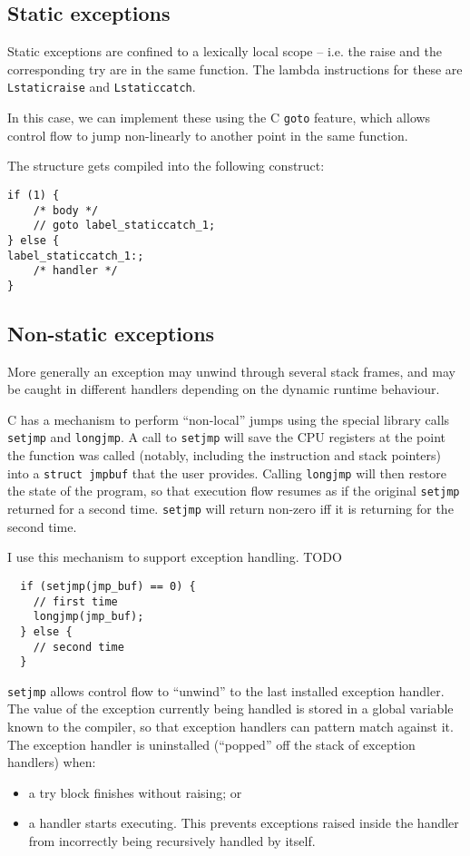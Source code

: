 \documentclass[12pt,a4paper,twoside,openright]{report}
\begin{document}
\subsection{Static exceptions}

Static exceptions are confined to a lexically local scope -- i.e. the raise and the corresponding try are in the same function. The lambda instructions for these are \lstinline!Lstaticraise! and \lstinline!Lstaticcatch!.

In this case, we can implement these using the C \lstinline!goto! feature, which allows control flow to jump non-linearly to another point in the same function.

The structure gets compiled into the following construct:

\begin{lstlisting}
if (1) {
    /* body */
    // goto label_staticcatch_1;
} else {
label_staticcatch_1:;
    /* handler */
}
\end{lstlisting}

\subsection{Non-static exceptions}

More generally an exception may unwind through several stack frames, and may be caught in different handlers depending on the dynamic runtime behaviour.

C has a mechanism to perform ``non-local'' jumps using the special library calls \lstinline!setjmp! and \lstinline!longjmp!. A call to \lstinline!setjmp! will save the CPU registers at the point the function was called (notably, including the instruction and stack pointers) into a \lstinline!struct jmpbuf! that the user provides. Calling \lstinline!longjmp! will then restore the state of the program, so that execution flow resumes as if the original \lstinline!setjmp! returned for a second time. \lstinline!setjmp! will return non-zero iff it is returning for the second time.

I use this mechanism to support exception handling. TODO

\begin{lstlisting}
  if (setjmp(jmp_buf) == 0) {
    // first time
    longjmp(jmp_buf);
  } else {
    // second time
  }
\end{lstlisting}

\lstinline!setjmp! allows control flow to ``unwind'' to the last installed exception handler. The value of the exception currently being handled is stored in a global variable known to the compiler, so that exception handlers can pattern match against it. The exception handler is uninstalled (``popped'' off the stack of exception handlers) when:
\begin{itemize}
  \item a try block finishes without raising; or
  \item a handler starts executing. This prevents exceptions raised inside the handler from incorrectly being recursively handled by itself.
\end{itemize}
\end{document}
